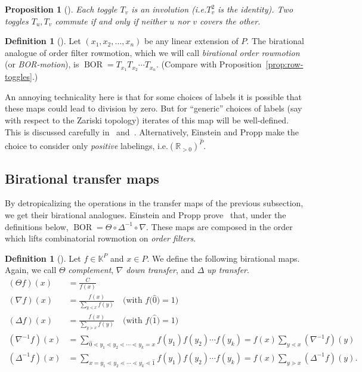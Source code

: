 \documentclass[10pt]{amsart}
\newtheorem{prop}[theo]{Proposition}
\theoremstyle{definition}
\newtheorem{defi}[theo]{Definition}
\newcommand{\ie}{i.e.}
\newcommand{\defn}[1]{\emph{#1}}
\newcommand{\rr}{\mathbb{R}}
\newcommand{\kk}{\mathbb{K}}
\newcommand{\down}{\nabla}
\newcommand{\up}{\Delta}
\DeclareMathOperator{\BOR}{BOR}
\begin{document}
\begin{prop}[\cite{einpropp,GrRo15}]\label{prop:BTogO-toggle-inv-commute}
Each toggle $T_v$ is an involution (\ie $T_v^2$ is the identity). Two toggles $T_u,T_v$ commute if and only if neither $u$ nor $v$ covers the other.
\end{prop}

\begin{defi}[{\cite[Definition~5.2]{einpropp}}]
Let $(x_1,x_2,\dots,x_n)$ be any linear extension of $P$.
The birational analogue of order filter rowmotion, which we will call
\defn{birational order rowmotion} (or \defn{BOR-motion}),
is $\BOR= T_{x_1} T_{x_2} \cdots T_{x_n}$. (Compare with
Proposition~\ref{prop:row-toggles}.)
\end{defi}
An annoying technicality here is that for some choices of labels it is possible that these
maps could lead to division by zero. But for ``generic'' choices of labels (say with respect to the
Zariski topology) iterates of this map will be well-defined. This is discussed
carefully in~\cite[\S~1]{GrRo16} and~\cite[\S~3]{GrRo15}. Alternatively, Einstein and Propp
make the choice to consider only \textit{positive} labelings, \ie $(\rr_{>
0})^{\widehat{P}}$.


\subsection{Birational transfer maps}
By detropicalizing the operations in the transfer maps of the previous subsection, we get
their birational analogues. Einstein and Propp prove~\cite[\S~6]{einpropp} that, under the definitions below,
$\BOR=\Theta\circ\up^{-1}\circ\down$. 
These maps are composed in the order which lifts 
combinatorial rowmotion on \textit{order filters}.


\begingroup 
\allowdisplaybreaks

\begin{defi}[{\cite[\S~6]{einpropp}}]\label{def:bir-trans}
Let $f\in \kk^P$ and $x\in P$. We define the following birational maps. 
Again, we call $\Theta$ \defn{complement}, $\down$ \defn{down transfer},
and $\up$ \defn{up transfer}.
\begin{align*}
 (\Theta f)(x) &= \frac{C}{f(x)}\\
 (\down f)(x) &= \frac{f(x)}{\sum\limits_{y\lessdot x} f(y)} \quad \big(\text{with } f\big(\widehat{0}\big)=1\big)\\
 (\up f)(x) &= 
 \frac{f(x)}{\sum\limits_{y\gtrdot x} f(y)} \quad \big(\text{with } f\big(\widehat{1}\big)=1\big)\\
 \left(\down^{-1}f\right)(x) &=
 \sum_{\widehat{0}\lessdot y_1\lessdot y_2 \lessdot \cdots \lessdot y_k=x} f(y_1)f(y_2)\cdots f(y_k)
 =f(x) \sum\limits_{y\lessdot x}\left(\down^{-1}f\right)(y)\\
 \left(\up^{-1}f\right)(x) &=
 \sum_{x=y_1 \lessdot y_2\lessdot \cdots \lessdot y_k\lessdot \widehat{1}} f(y_1)f(y_2)\cdots f(y_k)
 =f(x) \sum\limits_{y\gtrdot x}\left(\up^{-1}f\right)(y).
\end{align*}
\end{defi}
\end{document}
